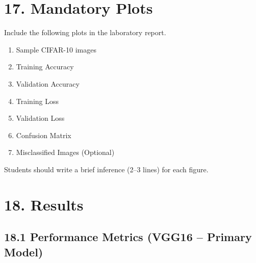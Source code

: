 \documentclass[11pt]{article}
\begin{document}

\section*{17. Mandatory Plots}

Include the following plots in the laboratory report.

\begin{enumerate}

\item Sample CIFAR-10 images

\item Training Accuracy

\item Validation Accuracy

\item Training Loss

\item Validation Loss

\item Confusion Matrix

\item Misclassified Images (Optional)

\end{enumerate}

Students should write a brief inference (2--3 lines) for each figure.


\section*{18. Results}

\subsection*{18.1 Performance Metrics (VGG16 -- Primary Model)}
\end{document}
